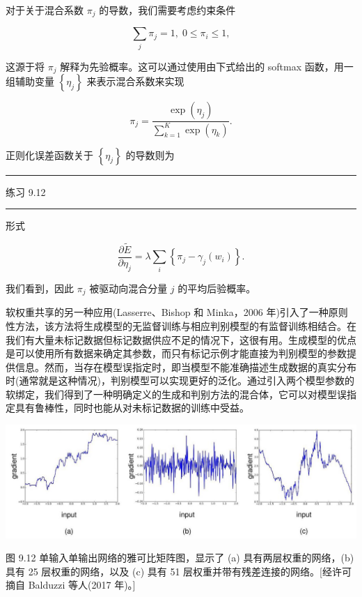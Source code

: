 \documentclass[10pt]{article}
\newcommand{\HRule}{\begin{center}\rule{0.9\linewidth}{0.2mm}\end{center}}
\begin{document}
对于关于混合系数 \({\pi }_{j}\) 的导数，我们需要考虑约束条件

\[
\mathop{\sum }\limits_{j}{\pi }_{j} = 1,\;0 \leq  {\pi }_{i} \leq  1, \tag{9.29}
\]

这源于将 \({\pi }_{j}\) 解释为先验概率。这可以通过使用由下式给出的 softmax 函数，用一组辅助变量 \(\left\{  {\eta }_{j}\right\}\) 来表示混合系数来实现

\[
{\pi }_{j} = \frac{\exp \left( {\eta }_{j}\right) }{\mathop{\sum }\limits_{{k = 1}}^{K}\exp \left( {\eta }_{k}\right) }. \tag{9.30}
\]

正则化误差函数关于 \(\left\{  {\eta }_{j}\right\}\) 的导数则为

\HRule

练习 9.12

\HRule

形式

\[
\frac{\partial \widetilde{E}}{\partial {\eta }_{j}} = \lambda \mathop{\sum }\limits_{i}\left\{  {{\pi }_{j} - {\gamma }_{j}\left( {w}_{i}\right) }\right\}  . \tag{9.31}
\]

我们看到，因此 \({\pi }_{j}\) 被驱动向混合分量 \(j\) 的平均后验概率。

软权重共享的另一种应用(Lasserre、Bishop 和 Minka，2006 年)引入了一种原则性方法，该方法将生成模型的无监督训练与相应判别模型的有监督训练相结合。在我们有大量未标记数据但标记数据供应不足的情况下，这很有用。生成模型的优点是可以使用所有数据来确定其参数，而只有标记示例才能直接为判别模型的参数提供信息。然而，当存在模型误指定时，即当模型不能准确描述生成数据的真实分布时(通常就是这种情况)，判别模型可以实现更好的泛化。通过引入两个模型参数的软绑定，我们得到了一种明确定义的生成和判别方法的混合体，它可以对模型误指定具有鲁棒性，同时也能从对未标记数据的训练中受益。

\begin{center}
\includegraphics[max width=1.0\textwidth]{images/0194e279-9b28-703a-88f4-c3ac21e2010d_293_214_355_1359_438_0.jpg}
\end{center}
\hspace*{3em} 

图 9.12 单输入单输出网络的雅可比矩阵图，显示了 (a) 具有两层权重的网络，(b) 具有 25 层权重的网络，以及 (c) 具有 51 层权重并带有残差连接的网络。[经许可摘自 Balduzzi 等人(2017 年)。]
\end{document}
